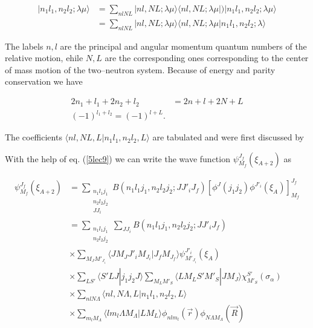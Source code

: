 \begin{subappendices}
\begin{equation}\label{5lec9}
\begin{split}
| n_1 l_1,n_2 l_2; \lambda \mu \rangle&= \sum_{n l N L} | n l,N L; \lambda \mu \rangle \langle n l,N L; \lambda \mu |\bigr )
| n_1 l_1,n_2 l_2; \lambda \mu \rangle \\
&=\sum_{n l N L} | n l,N L; \lambda \mu \rangle \langle n l,N L; \lambda \mu | n_1 l_1,n_2 l_2; \lambda  \rangle
\end{split}
\end{equation}

The labels $n,l$ are the principal and angular momentum quantum numbers of the relative motion, ehile $N,L$ are the corresponding ones corresponding to the center of mass motion of the two--neutron system. Because of energy and parity conservation we have


\begin{equation}\label{5lec10}
\begin{split}
2n_1+l_1+2n_2+l_2&=2n+l+2N+L\\
(-1)^{l_1+l_2}=(-1)^{l+L}.
\end{split}
\end{equation}

The coefficients $\langle n l,N L, L | n_1 l_1,n_2 l_2, L  \rangle$ are tabulated and were first discussed by \citep{Moshinsky:59}
	

With the help of eq. (\ref{5lec9}) we can write the wave function $\psi_{M_f}^{J_f}(\xi_{A+2})$ as


\begin{equation}\label{5lec11}
\begin{split}
\psi_{M_f}^{J_f}(\xi_{A+2})&= \sum_{\substack{n_1 l_1 j_1\\n_2 l_2 j_2\\ J J_i}} B(n_1 l_1 j_1,n_2 l_2 j_2;JJ'_i J_f)
\left[ \phi^J(j_1 j_2) \phi^{J'_i}(\xi_A)\right]^{J_f}_{M_f}\\
&= \sum_{\substack{n_1 l_1 j_1\\n_2 l_2 j_2}} \sum_{J J_i }B(n_1 l_1 j_1,n_2 l_2 j_2;JJ'_i J_f)\\
& \times \sum_{M_J M'_{J_i}} \langle J M_J J'_i M_{J_i}|J_f M_{J_f}\rangle \psi_{M'_{J_i}}^{J'_i}(\xi_{A})\\
& \times \sum_{L S'} \langle S' L J |j_1 j_2 J \rangle \sum_{M_L M'_S} \langle L M_L S' M'_S |J M_J  \rangle \chi^{S'}_{M'_S}(\sigma_\alpha)\\
& \times \sum_{n l N \Lambda} \langle n l,N \Lambda, L |n_1 l_1,n_2 l_2, L \rangle \\
& \times \sum_{m_l  M_\Lambda}
\langle l m_l \Lambda M_\Lambda |L M_L \rangle \phi_{n l m_l}(\vec r) \phi_{N \Lambda M_\Lambda}(\vec R)
\end{split}
\end{equation}


\end{subappendices}
